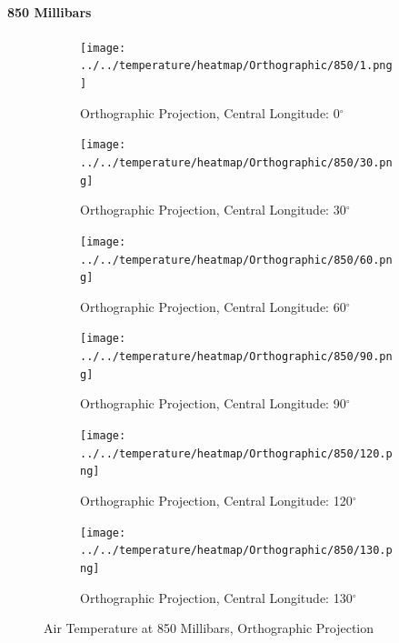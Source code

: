 \documentclass[hidelinks]{article}
\begin{document}
\paragraph{850 Millibars}
\begin{figure}[h!]
	\begin{subfigure}[b]{0.45545\linewidth}
		\centering
		\texttt{[image: ../../temperature/heatmap/Orthographic/850/1.png]}
		\caption{Orthographic Projection, Central Longitude: 0$^\circ$}
	\end{subfigure}
	\begin{subfigure}[b]{0.45545\linewidth}
		\centering
		\texttt{[image: ../../temperature/heatmap/Orthographic/850/30.png]}
		\caption{Orthographic Projection, Central Longitude: 30$^\circ$}
	\end{subfigure}
	\begin{subfigure}[b]{0.45545\linewidth}
		\centering
		\texttt{[image: ../../temperature/heatmap/Orthographic/850/60.png]}
		\caption{Orthographic Projection, Central Longitude: 60$^\circ$}
	\end{subfigure}
	\begin{subfigure}[b]{0.45545\linewidth}
		\centering
		\texttt{[image: ../../temperature/heatmap/Orthographic/850/90.png]}
		\caption{Orthographic Projection, Central Longitude: 90$^\circ$}
	\end{subfigure}
	\begin{subfigure}[b]{0.45545\linewidth}
		\centering
		\texttt{[image: ../../temperature/heatmap/Orthographic/850/120.png]}
		\caption{Orthographic Projection, Central Longitude: 120$^\circ$}
	\end{subfigure}
	\begin{subfigure}[b]{0.45545\linewidth}
		\centering
		\texttt{[image: ../../temperature/heatmap/Orthographic/850/130.png]}
		\caption{Orthographic Projection, Central Longitude: 130$^\circ$}
	\end{subfigure}
	\caption{Air Temperature at 850 Millibars, Orthographic Projection}
\end{figure}
\newpage
\end{document}
